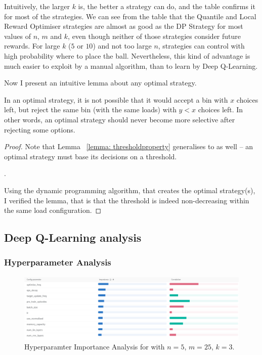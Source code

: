 Intuitively, the larger $k$ is, the better a strategy can do, and the table confirms it for most of the strategies. We can see from the table that the Quantile and Local Reward Optimiser strategies are almost as good as the DP Strategy for most values of $n$, $m$ and $k$, even though neither of those strategies consider future rewards. For large $k$ ($5$ or $10$) and not too large $n$, strategies can control with high probability where to place the ball. Nevertheless, this kind of advantage is much easier to exploit by a manual algorithm, than to learn by Deep Q-Learning.



Now I present an intuitive lemma about any optimal strategy.


\begin{lemma} \label{lemma: k-thinning-increasing-threshold}
In an optimal strategy, it is not possible that it would accept a bin with $x$ choices left, but reject the same bin (with the same loads) with $y<x$ choices left. In other words, an optimal strategy should never become more selective after rejecting some options.
\end{lemma}


\begin{proof}
Note that Lemma ~\ref{lemma: thresholdproperty} generalises to \KThinning as well -- an optimal strategy must base its decisions on a threshold.


.


Using the dynamic programming algorithm, that creates the optimal strategy(s), I verified the lemma, that is that the threshold is indeed non-decreasing within the same load configuration.
\end{proof}


\subsection{Deep Q-Learning analysis}



\subsubsection{Hyperparameter Analysis}


\begin{figure}[hbt!] \label{k-thinning-hyperparameter-analysis}
    \centering
    \includegraphics[scale=0.4]{Chapter4/Figs/Hyperparameter_analysis_5_25_3.png}
    \caption{Hyperparamter Importance Analysis for \KThinning with $n=5$, $m=25$, $k=3$.}
\end{figure}

